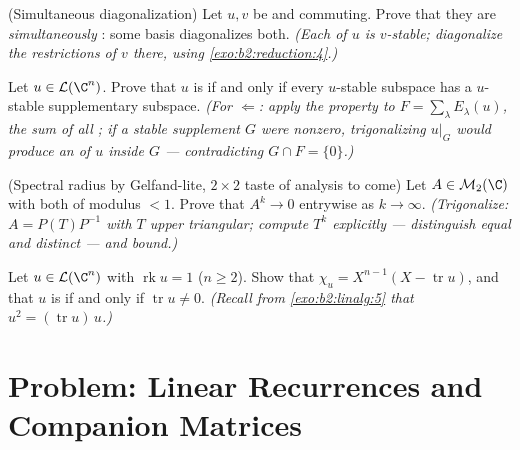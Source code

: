 \begin{exercise}[$\star\star\star$]\label{exo:b2:reduction:9}
(Simultaneous diagonalization) Let $u, v$ be  and
commuting. Prove that they are \emph{simultaneously}
: some basis diagonalizes both. \emph{(Each 
of $u$ is $v$-stable; diagonalize the restrictions of $v$ there,
using \cref{exo:b2:reduction:4}.)}
\end{exercise}

\begin{exercise}[$\star\star\star$]\label{exo:b2:reduction:10}
Let $u \in \mathcal{L}(\C^n)$. Prove that $u$ is  if
and only if every $u$-stable subspace has a $u$-stable
supplementary subspace. \emph{(For $\Leftarrow$: apply the property
to $F = \sum_\lambda E_\lambda(u)$, the sum of all ; if a
stable supplement $G$ were nonzero, trigonalizing $u|_G$ would
produce an  of $u$ inside $G$ --- contradicting $G \cap
F = \{0\}$.)}
\end{exercise}

\begin{exercise}[$\star\star\star$]\label{exo:b2:reduction:11}
(Spectral radius by Gelfand-lite, $2\times2$ taste of analysis to
come) Let $A \in \mathcal{M}_2(\C)$ with both  of
modulus $< 1$. Prove that $A^k \to 0$ entrywise as $k \to \infty$.
\emph{(Trigonalize: $A = P(T)P^{-1}$ with $T$ upper triangular;
compute $T^k$ explicitly --- distinguish equal and distinct
 --- and bound.)}
\end{exercise}

\begin{exercise}[$\star\star$]\label{exo:b2:reduction:12}
Let $u \in \mathcal{L}(\C^n)$ with $\operatorname{rk} u = 1$ ($n
\geq 2$). Show that $\chi_u = X^{n-1}(X - \operatorname{tr} u)$,
and that $u$ is  if and only if $\operatorname{tr} u
\neq 0$. \emph{(Recall from \cref{exo:b2:linalg:5} that $u^2 =
(\operatorname{tr} u)\,u$.)}
\end{exercise}

\section{Problem: Linear Recurrences and Companion Matrices}

